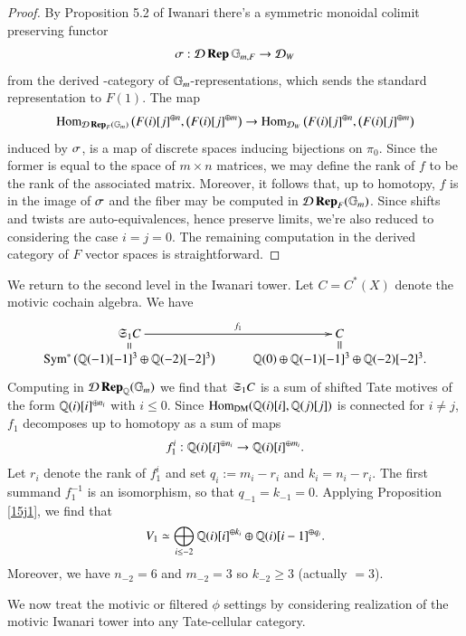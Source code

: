 \begin{proof}
By Proposition 5.2 of Iwanari \cite{Iwanari} there's a symmetric monoidal colimit preserving functor
\[
\sigma:\mathcal{D} \operatorname{\bf{Rep}} \mathbb{G}_{m, F} \to \mathcal{D}_W
\]
from the derived \oo-category of ${\mathbb{G}_m}$-representations, which sends the standard representation to $F(1)$. The map
\[
\operatorname{Hom}_{\mathcal{D} \operatorname{\bf{Rep}}_F({\mathbb{G}_m})}
\big(F(i)[j]^{\oplus n}, \big(F(i)[j]^{\oplus m} \big) 
\to
\operatorname{Hom}_{\mathcal{D}_W}
\big(F(i)[j]^{\oplus n}, \big(F(i)[j]^{\oplus m} \big)  
\]
induced by $\sigma$, is a map of discrete spaces inducing bijections on $\pi_0$. Since the former is equal to the space of $m \times n$ matrices, we may define the rank of $f$ to be the rank of the associated matrix. Moreover, it follows that, up to homotopy, $f$ is in the image of $\sigma$ and the fiber may be computed in $\mathcal{D} \operatorname{\bf{Rep}}_F({\mathbb{G}_m})$. Since shifts and twists are auto-equivalences, hence preserve limits, we're also reduced to considering the case $i = j = 0$. The remaining computation in the derived category of $F$ vector spaces is straightforward.
\end{proof}

\sspar{}
\label{FA14}
We return to the second level in the Iwanari tower. Let $C = C^*(X)$ denote the motivic cochain algebra. We have
\[
\xymatrix@R = 1ex
{
\fkS_1 C
\ar@{=}[d] \ar[r]^-{f_1}
 & 
C
 \ar@{=}[d]
\\
\Sym^* \big(\QQ(-1)[-1]^3 \oplus \QQ(-2)[-2]^3   \big)
&
\QQ(0) \oplus \QQ(-1)[-1]^3 \oplus \QQ(-2)[-2]^3.
}
\]
Computing in $\mathcal{D} \operatorname{\bf{Rep}}_{\mathbb{Q}}({\mathbb{G}_m})$ we find that $\mathfrak{S}_1 C$ is a sum of shifted Tate motives of the form $\mathbb{Q}(i)[i]^{\oplus n_i}$ with $i \le 0$. Since $\operatorname{Hom}_{\operatorname{DM}}(\mathbb{Q}(i)[i],\mathbb{Q}(j)[j])$ is connected for $i \neq j$, $f_1$ decomposes up to homotopy as a sum of maps 
\[
f_1^i: \mathbb{Q}(i)[i]^{\oplus n_i} \to \mathbb{Q}(i)[i]^{\oplus m_i}. 
\]
Let $r_i$ denote the rank of $f_1^i$ and set $q_i:= m_i - r_i$ and $k_i = n_i - r_i$. The first summand $f_1^{-1}$ is an isomorphism, so that $q_{-1} = k_{-1} = 0$. Applying Proposition \ref{15j1}, we find that 
\[
V_1 \simeq \bigoplus_{i \le -2}
\mathbb{Q}(i)[i]^{\oplus k_i} \oplus \mathbb{Q}(i)[i-1]^{\oplus q_i}.
\]
Moreover, we have $n_{-2} = 6$ and $m_{-2} = 3$ so $k_{-2} \ge 3$ (actually $=3$).


\sspar{}
\label{FA15}
We now treat the motivic or filtered $\phi$ settings by considering realization of the motivic Iwanari tower into any Tate-cellular category. 


